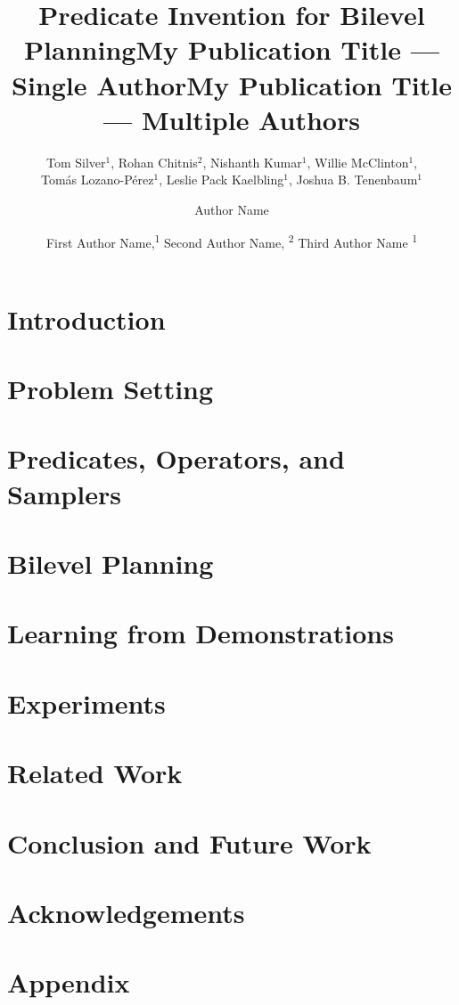 \documentclass[letterpaper]{article} %
\title{Predicate Invention for Bilevel Planning}
\author{
    Tom Silver\equalcontrib$^1$,
    Rohan Chitnis\equalcontrib$^2$,
    Nishanth Kumar$^1$,
    Willie McClinton$^1$,\\
    Tom\'as Lozano-P\'erez$^1$,
    Leslie Pack Kaelbling$^1$,
    Joshua B. Tenenbaum$^1$
}
\title{My Publication Title --- Single Author}
\author {
    Author Name
}
\title{My Publication Title --- Multiple Authors}
\author {
    First Author Name,\textsuperscript{\rm 1}
    Second Author Name, \textsuperscript{\rm 2}
    Third Author Name \textsuperscript{\rm 1}
}
\begin{document}
\maketitle



\section{Introduction}
\label{sec:intro}



\section{Problem Setting}
\label{sec:problem}



\section{Predicates, Operators, and Samplers}
\label{sec:representation}



\section{Bilevel Planning}
\label{sec:planning}



\section{Learning from Demonstrations}
\label{sec:learning}



\section{Experiments}
\label{sec:experiments}



\section{Related Work}
\label{sec:rw}



\section{Conclusion and Future Work}
\label{sec:conclusion}



\clearpage
\section*{Acknowledgements}




\appendix

\clearpage
\section{Appendix}
\label{sec:Appendix}


\end{document}
